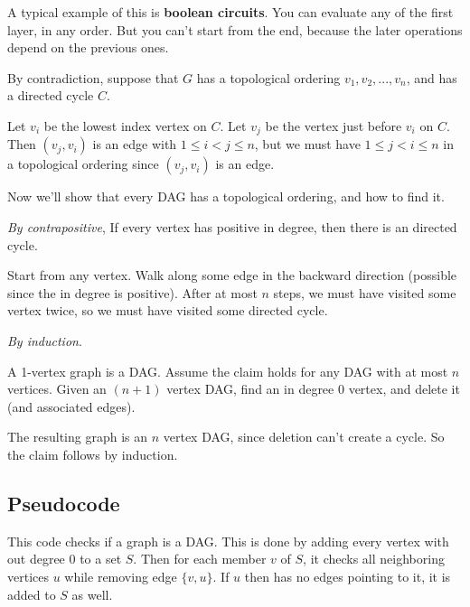 \documentclass[12pt]{article}
\begin{document}
  A typical example of this is {\bf boolean circuits}. You can evaluate any of
  the first layer, in any order. But you can't start from the end, because the
  later operations depend on the previous ones.

  {
    By contradiction, suppose that $G$ has a topological ordering $v_1, v_2,
    ..., v_n$, and has a directed cycle $C$.

    Let $v_i$ be the lowest index vertex on $C$. Let $v_j$ be the vertex just
    before $v_i$ on $C$. Then $(v_j, v_i)$ is an edge with $1 \le i < j \le n$,
    but we must have $1 \le j < i \le n$ in a topological ordering since $(v_j,
    v_i)$ is an edge.

  }

  Now we'll show that every DAG has a topological ordering, and how to find it.

  {
    {\it By contrapositive}, If every vertex has positive in degree, then there
    is an directed cycle.

    Start from any vertex. Walk along some edge in the backward direction (possible
    since the in degree is positive). After at most $n$ steps, we must have visited
    some vertex twice, so we must have visited some directed cycle.
  }

  {
    {\it By induction}.

    \induction
    {
      A 1-vertex graph is a DAG.
    }
    {
      Assume the claim holds for any DAG with at most $n$ vertices.
    }
    {
      Given an $(n + 1)$ vertex DAG, find an in degree $0$ vertex, and delete it
      (and associated edges).
    }

    The resulting graph is an $n$ vertex DAG, since deletion can't create a cycle.
    So the claim follows by induction.
  }



  \subsection {Pseudocode}
  This code checks if a graph is a DAG. This is done by adding every vertex with
  out degree $0$ to a set $S$. Then for each member $v$ of $S$, it checks all
  neighboring vertices $u$ while removing edge $\{v, u\}$. If $u$ then has no
  edges pointing to it, it is added to $S$ as well.
\end{document}
